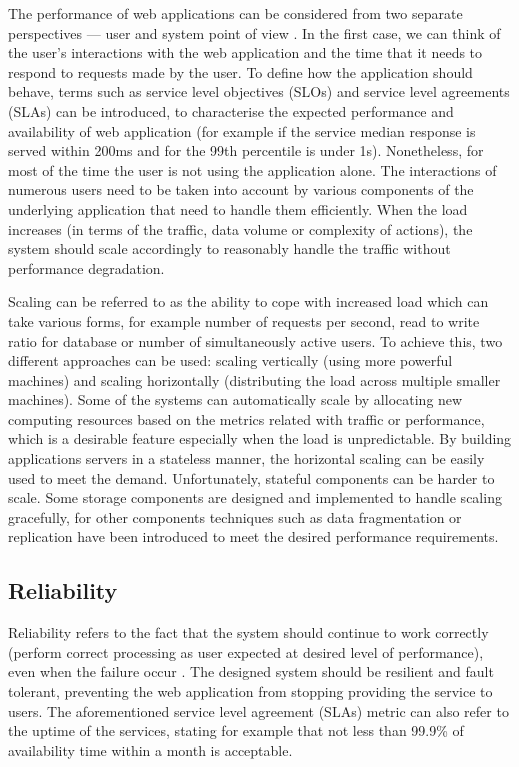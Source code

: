 The performance of web applications can be considered from two separate perspectives --- user and system point of view \cite{DesignDataIntensiveApplications}. In the first case, we can think of the user's interactions with the web application and the time that it needs to respond to requests made by the user. To define how the application should behave, terms such as service level objectives (SLOs) and service level agreements (SLAs) can be introduced, to characterise the expected performance and availability of web application (for example if the service median response is served within 200ms and for the 99th percentile is under 1s). Nonetheless, for most of the time the user is not using the application alone. The interactions of numerous users need to be taken into account by various components of the underlying application that need to handle them efficiently. When the load increases (in terms of the traffic, data volume or complexity of actions), the system should scale accordingly to reasonably handle the traffic without performance degradation. 

Scaling can be referred to as the ability to cope with increased load which can take various forms, for example number of requests per second, read to write ratio for database or number of simultaneously active users. To achieve this, two different approaches can be used: scaling vertically (using more powerful machines) and scaling horizontally (distributing the load across multiple smaller machines). Some of the systems can automatically scale by allocating new computing resources based on the metrics related with traffic or performance, which is a desirable feature especially when the load is unpredictable. By building applications servers in a stateless manner, the horizontal scaling can be easily used to meet the demand. Unfortunately, stateful components can be harder to scale. Some storage components are designed and implemented to handle scaling gracefully, for other components techniques such as data fragmentation or replication have been introduced to meet the desired performance requirements.

\subsection{Reliability}

Reliability refers to the fact that the system should continue to work correctly (perform correct processing as user expected at desired level of performance), even when the failure occur \cite{DesignDataIntensiveApplications}. The designed system should be resilient and fault tolerant, preventing the web application from stopping providing the service to users. The aforementioned service level agreement (SLAs) metric can also refer to the uptime of the services, stating for example that not less than 99.9\% of availability time within a month is acceptable.

